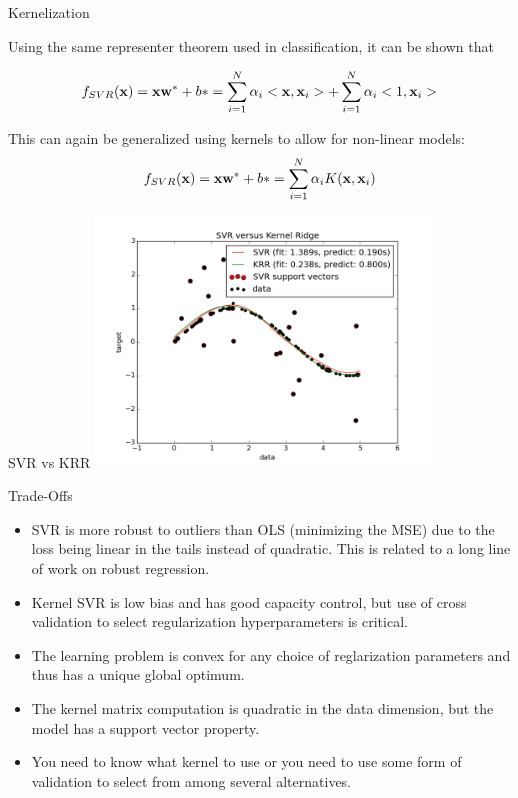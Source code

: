 \documentclass[serif,xcolor=pdftex,dvipsnames,table,hyperref={bookmarks=false,breaklinks}]{beamer}
\begin{document}
\begin{frame}[t]{Kernelization}

Using the same representer theorem used in classification, it can be shown that

$$f_{SVR}({\mathbf{x}}) = {\mathbf{x}}{\mathbf{w}}^*+b* = \sum_{i=1}^N \alpha_i<{\mathbf{x}},{\mathbf{x}}_i> + \sum_{i=1}^N \alpha_i<1,{\mathbf{x}}_i>$$

\pause This can again be generalized using kernels to allow for non-linear models:
$$f_{SVR}({\mathbf{x}}) = {\mathbf{x}}{\mathbf{w}}^*+b* = \sum_{i=1}^N \alpha_iK({\mathbf{x}},{\mathbf{x}}_i)$$


\end{frame}

\begin{frame}[t]{SVR vs KRR}
\center
\includegraphics[width=3.5in]{../Figures/svr_vs_krr.png}
\end{frame}

\begin{frame}[t]{Trade-Offs}

\begin{itemize}
\item SVR is more robust to outliers than OLS (minimizing the MSE) due to the loss being linear in the tails instead of quadratic. This is related to a long line of work on robust regression.

\pause \item Kernel SVR is low bias and has good capacity control, but use of
cross validation to select regularization hyperparameters is critical.

\pause\item The learning problem is convex for any choice of 
reglarization parameters and thus has a unique global optimum.

\pause\item The kernel matrix computation is quadratic in the data dimension,
but the model has a support vector property.

\pause\item You need to know what kernel to use or you need to
use some form of validation to select from among several alternatives.

\end{itemize}

\end{frame}
\end{document}
